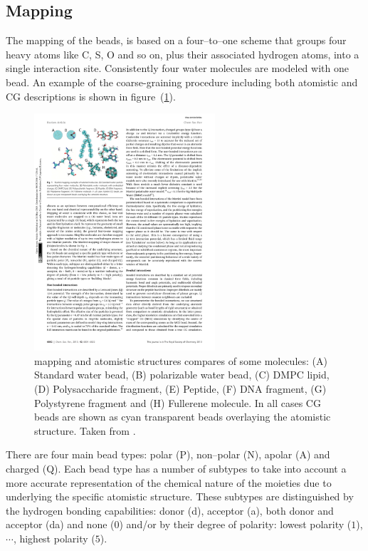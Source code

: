 \subsection{Mapping}
The mapping of the \martini beads, is based on a four--to--one scheme that groups four heavy atoms like C, S, O and so on, plus their associated hydrogen atoms, into a single interaction site. Consistently four water molecules are modeled with one \martini bead. An example of the coarse-graining procedure including both atomistic and \ac{CG} descriptions is shown in figure~(\ref{fig:martiniMapping}).
\begin{figure}[!ht]
	\centering
	\includegraphics[width=0.6\textwidth]{img/martiniMapping}
	\caption{\martini mapping and atomistic structures compares of some molecules: (A) Standard water bead, (B) polarizable water bead, (C) \acs{DMPC} lipid, (D) Polysaccharide fragment, (E) Peptide, (F) \acs{DNA} fragment, (G) Polystyrene fragment and (H) Fullerene molecule. In all cases \martini \acs{CG} beads are shown as cyan transparent beads overlaying the atomistic structure. Taken from \cite{MartiniReview}.}
	\label{fig:martiniMapping}
\end{figure}

There are four main bead types: polar (P), non--polar (N), apolar (A) and charged (Q). Each bead type has a number of subtypes to take into account a more accurate representation of the chemical nature of the moieties due to underlying the specific atomistic structure. These subtypes are distinguished by the hydrogen bonding capabilities: donor (d), acceptor (a), both donor and acceptor (da) and none ($0$) and/or by their degree of polarity: lowest polarity ($1$), $\cdots$, highest polarity ($5$).

